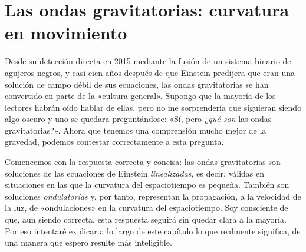 \chapter[Ondas gravitatorias]{Las ondas gravitatorias: curvatura en movimiento}\label{ch:08}

Desde su detección directa en 2015 mediante la fusión de un sistema binario de agujeros negros, y casi cien años después de que Einstein predijera que eran una solución de campo débil de sus ecuaciones, las ondas gravitatorias se han convertido en parte de la «cultura general». Supongo que la mayoría de los lectores habrán oído hablar de ellas, pero no me sorprendería que siguieran siendo algo oscuro y uno se quedara preguntándose: «Sí, pero ¿\emph{qué son} las ondas gravitatorias?». Ahora que tenemos una comprensión mucho mejor de la gravedad, podemos contestar correctamente a esta pregunta.

Comencemos con la respuesta correcta y concisa: las ondas gravitatorias son soluciones de las ecuaciones de Einstein \emph{linealizadas}, es decir, válidas en situaciones en las que la curvatura del espaciotiempo es pequeña. También son soluciones \emph{ondulatorias} y, por tanto, representan la propagación, a la velocidad de la luz, de «ondulaciones» en la curvatura del espaciotiempo. Soy consciente de que, aun siendo correcta, esta respuesta seguirá sin quedar clara a la mayoría. Por eso intentaré explicar a lo largo de este capítulo lo que realmente significa, de una manera que espero resulte más inteligible.

